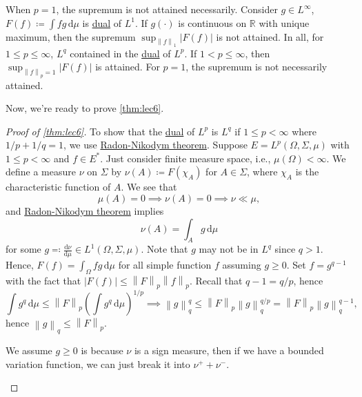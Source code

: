 
\begin{remark}
	When \(p = 1\), the supremum is not attained necessarily. Consider \(g\in L^{\infty} \), \(F(f) \coloneqq \int fg\,\mathrm{d} \mu \) is \hyperref[def:dual-space]{dual} of \(L^1\). If \(g(\cdot)\) is continuous on \(\mathbb{R} \) with unique maximum, then the supremum \(\sup _{\left\lVert f\right\rVert _1}\left\vert F(f) \right\vert\) is not attained. In all, for \(1 \leq p\leq \infty \), \(L^q\) contained in the \hyperref[def:dual-space]{dual} of \(L^p\). If \(1 < p \leq \infty \), then \(\sup _{\left\lVert f\right\rVert _p = 1} \left\vert F(f) \right\vert \) is attained. For \(p = 1\), the supremum is not necessarily attained.
\end{remark}

Now, we're ready to prove \autoref{thm:lec6}.

\begin{proof}[Proof of \autoref{thm:lec6}]
	To show that the \hyperref[def:dual-space]{dual} of \(L^p\) is \(L^q\) if \(1 \leq p < \infty \) where \(1 / p + 1 / q = 1\), we use \hyperref[thm:Radon-Nikodym]{Radon-Nikodym theorem}. Suppose \(E = L^p(\Omega , \Sigma , \mu )\) with \(1 \leq p < \infty \) and \(f\in E^{\ast} \). Just consider finite measure space, i.e., \(\mu (\Omega ) < \infty \). We define a measure \(\nu \) on \(\Sigma \) by \(\nu (A) \coloneqq F(\chi _A)\) for \(A\in \Sigma \), where \(\chi _A\) is the characteristic function of \(A\). We see that
	\[
		\mu (A) = 0 \implies \nu (A) = 0 \implies \nu \ll \mu,
	\]
	and \hyperref[thm:Radon-Nikodym]{Radon-Nikodym theorem} implies
	\[
		\nu (A) = \int _A g\,\mathrm{d} \mu
	\]
	for some \(g \eqqcolon \frac{\mathrm{d}\nu }{\mathrm{d}\mu } \in L^1(\Omega , \Sigma , \mu )\). Note that \(g\) may not be in \(L^q\) since \(q > 1\). Hence, \(F(f)= \int _\Omega fg \,\mathrm{d} \mu \) for all simple function \(f\) assuming \(g \geq 0\). Set \(f = g^{q - 1}\) with the fact that \(\left\vert F(f) \right\vert  \leq \left\lVert F\right\rVert _p \left\lVert f\right\rVert _p\). Recall that \(q - 1 = q / p\), hence
	\[
		\int g^q\,\mathrm{d} \mu \leq \left\lVert F\right\rVert _p \left( \int g^q \,\mathrm{d} \mu  \right) ^{1 / p} \implies \left\lVert g\right\rVert _q ^q \leq \left\lVert F\right\rVert _p \left\lVert g\right\rVert _q ^{q / p} = \left\lVert F\right\rVert _p \left\lVert g\right\rVert _q ^{q - 1},
	\]
	hence \(\left\lVert g\right\rVert _q \leq \left\lVert F\right\rVert _p\).

	\begin{note}
		We assume \(g \geq 0\) is because \(\nu \) is a sign measure, then if we have a bounded variation function, we can just break it into \(\nu ^+ + \nu ^-\).
	\end{note}
\end{proof}

